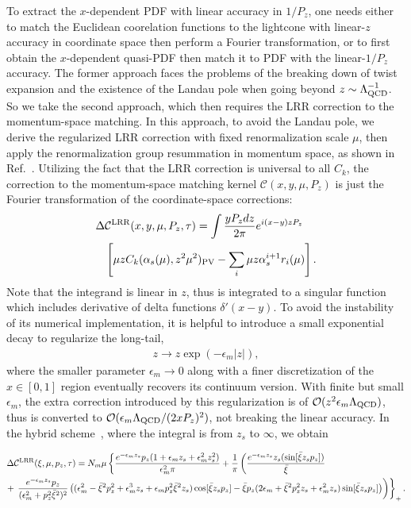 \documentclass[prd,aps,nofootinbib,superscriptaddress,floatfix,preprintnumbers,twocolumn]{revtex4}
\begin{document}
To extract the $x$-dependent PDF with linear accuracy in $1/P_z$, one needs either to match the Euclidean coorelation functions to the lightcone with linear-$z$ accuracy in coordinate space then perform a Fourier transformation, or to first obtain the $x$-dependent quasi-PDF then match it to PDF with the linear-$1/P_z$ accuracy. The former approach faces the problems of the breaking down of twist expansion and the existence of the Landau pole when going beyond $z\sim\Lambda^{-1}_{\rm QCD}$. So we take the second approach, which then requires the LRR correction to the momentum-space matching. In this approach, to avoid the Landau pole, we derive the regularized LRR correction with fixed renormalization scale $\mu$, then apply the renormalization group resummation in momentum space, as shown in Ref.~\cite{Su:2022fiu}. Utilizing the fact that the LRR correction is universal to all $C_k$,
the correction to the momentum-space matching kernel $\mathcal{C}(x,y,\mu,P_z)$ is just the Fourier transformation of the coordinate-space corrections: 
\begin{align}
	\Delta& \mathcal{C}^{\rm LRR}(x,y,\mu,P_z,\tau)=\int \frac{yP_zdz}{2\pi} e^{i (x-y) zP_z}  \nonumber\\
 &\left[\mu z C_k(\alpha_s(\mu),z^2\mu^2)_{\rm PV}-\sum_i\mu z\alpha^{i+1}_s r_i(\mu)\right].
\end{align}
Note that the integrand is linear in $z$, thus is integrated to a singular function which includes derivative of delta functions $\delta'(x-y)$. To avoid the instability of its numerical implementation, it is helpful to introduce a small exponential decay to regularize the long-tail, 
\begin{align}
	z\to z\exp(-\epsilon_m |z|),
\end{align}
where the smaller parameter $\epsilon_m\to0$ along with a finer discretization of the $x\in[0,1]$ region eventually recovers its continuum version. With finite but small $\epsilon_m$, the extra correction introduced by this regularization is of $\mathcal{O}(z^2\epsilon_m\Lambda_{\rm QCD})$, thus is converted to $\mathcal{O}(\epsilon_m\Lambda_{\rm QCD}/(2xP_z)^2)$, not breaking the linear accuracy. In the hybrid scheme~\cite{Ji:2020brr}, where the integral is from $z_s$ to $\infty$, we obtain
\begin{widetext}
\begin{align}
	\Delta& \mathcal{C}^{\rm LRR}(\xi,\mu,p_z,\tau)=N_m\mu\left\{\frac{e^{-\epsilon_m z_s}p_z(1+\epsilon_m z_s+\epsilon_m^2z_s^2)}{\epsilon_m^2\pi}+\frac{1}{\pi}\left(\frac{e^{-\epsilon_m z_s}z_s(\sin[\bar{\xi} z_sp_z])}{\bar{\xi}}\right.\right.\\
	+&\left.\left.\frac{e^{-\epsilon_m z_s}p_z}{(\epsilon_m^2+p_z^2\bar{\xi}^2)^2}\left((\epsilon_m^2-\bar{\xi}^2p_z^2+\epsilon_m^3z_s+\epsilon_mp_z^2\bar{\xi}^2z_s)\cos[\bar{\xi} z_sp_z]-\bar{\xi} p_z(2\epsilon_m+\bar{\xi}^2p_z^2z_s+\epsilon_m^2z_s)\sin[\bar{\xi} z_sp_z]\right)\right)\right\}_+.\nonumber
\end{align}
\end{widetext}
\end{document}
